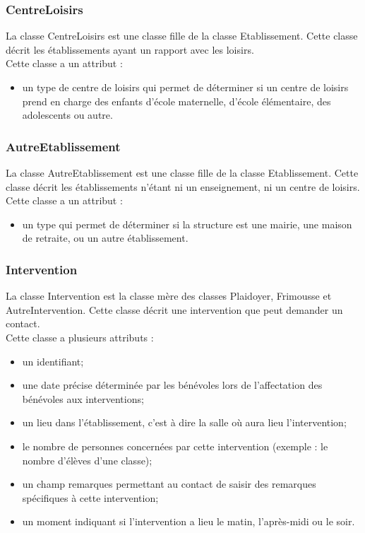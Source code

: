 \subsubsection*{CentreLoisirs}
La classe CentreLoisirs est une classe fille de la classe Etablissement. Cette classe décrit les établissements ayant un rapport avec les loisirs. \\
Cette classe a un attribut : 
\begin{itemize}
\item un type de centre de loisirs qui permet de déterminer si un centre de loisirs prend en charge des enfants d'école maternelle, d'école élémentaire, des adolescents ou autre.
\end{itemize}  

\subsubsection*{AutreEtablissement}
La classe AutreEtablissement est une classe fille de la classe Etablissement. Cette classe décrit les établissements n'étant ni un enseignement, ni un centre de loisirs. \\
Cette classe a un attribut : 
\begin{itemize}
\item un type qui permet de déterminer si la structure est une mairie, une maison de retraite, ou un autre établissement.
\end{itemize}  

\subsubsection*{Intervention}
La classe Intervention est la classe mère des classes Plaidoyer, Frimousse et AutreIntervention. Cette classe décrit une intervention que peut demander un contact. \\
Cette classe a plusieurs attributs :
\begin{itemize}
\item un identifiant;
\item une date précise déterminée par les bénévoles lors de l'affectation des bénévoles aux interventions;
\item un lieu dans l'établissement, c'est à dire la salle où aura lieu l'intervention;
\item le nombre de personnes concernées par cette intervention (exemple : le nombre d'élèves d'une classe);
\item un champ remarques permettant au contact de saisir des remarques spécifiques à cette intervention;
\item un moment indiquant si l'intervention a lieu le matin, l'après-midi ou le soir.
\end{itemize}

